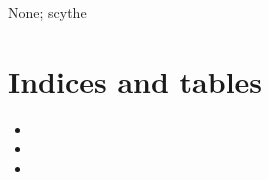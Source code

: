 \documentclass[letterpaper,11pt,english]{sphinxmanual}
\begin{document}
 None;  scythe


\chapter{Indices and tables}
\label{\detokenize{index:indices-and-tables}}\begin{itemize}
\item {} 

\item {} 

\item {} 

\end{itemize}



\renewcommand{\indexname}{Index}
\printindex
\end{document}

